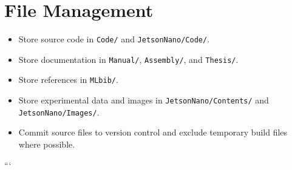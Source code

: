 \section{File Management}

\begin{itemize}
	\item Store source code in \texttt{Code/} and \texttt{JetsonNano/Code/}.
	\item Store documentation in \texttt{Manual/}, \texttt{Assembly/}, and \texttt{Thesis/}.
	\item Store references in \texttt{MLbib/}.
	\item Store experimental data and images in \texttt{JetsonNano/Contents/} and \texttt{JetsonNano/Images/}.
	\item Commit source files to version control and exclude temporary build files where possible.
\end{itemize}
```